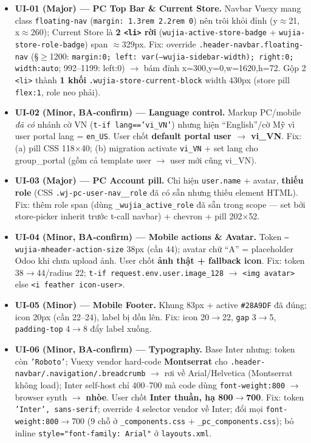 \begin{itemize}
  \item \textbf{UI-01 (Major) --- PC Top Bar \& Current Store.} Navbar Vuexy mang class
    \texttt{floating-nav} (\texttt{margin: 1.3rem 2.2rem 0}) nên trôi khỏi đỉnh (y$\approx$21, x$\approx$260);
    Current Store là \textbf{2 \texttt{<li>} rời} (\texttt{wujia-active-store-badge} + \texttt{wujia-store-role-badge})
    span $\approx$329px. Fix: override \texttt{.header-navbar.floating-nav} (\S{}$\ge$1200: \texttt{margin:0;
    left: var(--wujia-sidebar-width); right:0; width:auto}; 992--1199: left:0) $\to$ bám đỉnh x=300,y=0,w=1620,h=72.
    Gộp 2 \texttt{<li>} thành \textbf{1 khối} \texttt{.wujia-store-current-block} width 430px (store pill
    \texttt{flex:1}, role neo phải).
  \item \textbf{UI-02 (Minor, BA-confirm) --- Language control.} Markup PC/mobile \emph{đã có} nhánh cờ VN
    (\texttt{t-if lang=='vi\_VN'}) nhưng hiện ``English''/cờ Mỹ vì user portal lang = \texttt{en\_US}. User
    chốt \textbf{default portal user $\to$ vi\_VN}. Fix: (a) pill CSS 118$\times$40; (b) migration activate
    \texttt{vi\_VN} + set lang cho group\_portal (gồm cả template user $\to$ user mới cũng vi\_VN).
  \item \textbf{UI-03 (Major) --- PC Account pill.} Chỉ hiện \texttt{user.name} + avatar, \textbf{thiếu role}
    (CSS \texttt{.wj-pc-user-nav\_\_role} đã có sẵn nhưng thiếu element HTML). Fix: thêm role span (dùng
    \texttt{\_wujia\_active\_role} đã sẵn trong scope --- set bởi store-picker inherit trước t-call navbar) +
    chevron + pill 202$\times$52.
  \item \textbf{UI-04 (Minor, BA-confirm) --- Mobile actions \& Avatar.} Token
    \texttt{--wujia-mheader-action-size} 38px (cần 44); avatar chữ ``A'' = placeholder Odoo khi chưa upload
    ảnh. User chốt \textbf{ảnh thật + fallback icon}. Fix: token 38$\to$44/radius 22; \texttt{t-if
    request.env.user.image\_128} $\to$ \texttt{<img avatar>} else \texttt{<i feather icon-user>}.
  \item \textbf{UI-05 (Minor) --- Mobile Footer.} Khung 83px + active \texttt{\#28A9DF} đã đúng; icon 20px
    (cần 22--24), label bị dồn lên. Fix: icon 20$\to$22, \texttt{gap} 3$\to$5, \texttt{padding-top} 4$\to$8
    đẩy label xuống.
  \item \textbf{UI-06 (Minor, BA-confirm) --- Typography.} Base Inter nhưng: token còn \texttt{'Roboto'};
    Vuexy vendor hard-code \textbf{Montserrat} cho \texttt{.header-navbar/.navigation/.breadcrumb} $\to$ rơi
    về Arial/Helvetica (Montserrat không load); Inter self-host chỉ 400--700 mà code dùng
    \texttt{font-weight:800} $\to$ browser synth $\to$ \textbf{nhòe}. User chốt \textbf{Inter thuần, hạ
    800$\to$700}. Fix: token \texttt{'Inter', sans-serif}; override 4 selector vendor về Inter; đổi mọi
    \texttt{font-weight:800}$\to$700 (9 chỗ ở \texttt{\_components.css} + \texttt{\_pc\_components.css}); bỏ inline
    \texttt{style="font-family: Arial"} ở \texttt{layouts.xml}.
\end{itemize}

